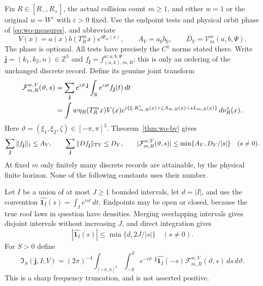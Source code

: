 Fix $R\in[R_-,R_+]$, the actual collision count $m\ge1$, and either
$w=1$ or the original $w=W^\varepsilon$ with $\varepsilon>0$ fixed.
Use the endpoint tests and physical orbit phase of
\eqref{eq:wo-measures}, and abbreviate
\[
 V(x)=a(x)b(T_R^mx)e^{i\Psi_m(x)},\qquad
 A_V=a_0b_0,\qquad D_V=\mathcal V_m^w(a,b,\Psi).
\]
The phase is optional.  All tests have precisely the $C^1$ norms stated
there.  Write $\mathbf j=(k_1,k_2,n)\in\mathbb Z^3$ and
$f_{\mathbf j}=f^{w;a,b,\Psi}_{(n,k),m,R}$; this is only an ordering
of the unchanged discrete record.  Define its genuine joint transform
\begin{equation}\label{eq:ui-transform}
 \begin{split}
 \mathcal F_{m,R}^{w,V}(\vartheta,s)
 &=\sum_{\mathbf j}e^{i\vartheta\cdot\mathbf j}
                         \int_{\mathbb R}e^{ist}f_{\mathbf j}(t)\,dt\\
 &=\int w\eta_R(T_R^mx)V(x)
       e^{i\{\xi\cdot K^{\rm c}_{m,R}(x)+\zeta A_{m,R}(x)
                         +sL_{m,R}(x)\}}\,d\nu_R^*(x).
 \end{split}
\end{equation}
Here $\vartheta=(\xi_1,\xi_2,\zeta)\in[-\pi,\pi]^3$.
Theorem~\ref{thm:wo-bv} gives
\begin{equation}\label{eq:ui-input}
 \sum_{\mathbf j}\|f_{\mathbf j}\|_1\le A_V,\qquad
 \sum_{\mathbf j}\|Df_{\mathbf j}\|_{\rm TV}\le D_V,
 \qquad
 |\mathcal F_{m,R}^{w,V}(\vartheta,s)|
       \le\min\{A_V,D_V/|s|\}\quad(s\ne0).
\end{equation}
At fixed $m$ only finitely many discrete records are attainable, by the
physical finite horizon.  None of the following constants uses their
number.

Let $I$ be a union of at most $J\ge1$ bounded intervals, let
$d=|I|$, and use the convention
$\widehat{\mathbf1_I}(s)=\int_Ie^{ist}\,dt$.  Endpoints may be open
or closed, because the true roof laws in question have densities.
Merging overlapping intervals gives disjoint intervals without
increasing $J$, and direct integration gives
\begin{equation}\label{eq:ui-window-transform}
 |\widehat{\mathbf1_I}(s)|\le\min\{d,2J/|s|\}\quad(s\ne0).
\end{equation}
For $S>0$ define
\begin{equation}\label{eq:ui-cutoff}
 \mathfrak I_S(\mathbf j,I;V)
  =(2\pi)^{-4}\int_{[-\pi,\pi]^3}\int_{-S}^{S}
      e^{-i\vartheta\cdot\mathbf j}\widehat{\mathbf1_I}(-s)
           \mathcal F_{m,R}^{w,V}(\vartheta,s)\,ds\,d\vartheta.
\end{equation}
This is a sharp frequency truncation, and is not asserted positive.

